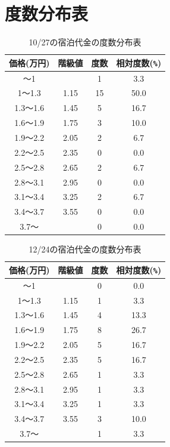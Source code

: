 \documentclass[11pt,a4j]{jsarticle}
\begin{document}
\section{度数分布表}

\begin{table}[H]
  \caption{10/27の宿泊代金の度数分布表}
  \label{tab:dosuu1}
  \small
  \begin{center}
      \begin{tabular}{c|c|c|c}
        \hline
        \toprule
        価格(万円) & 階級値 & 度数 & 相対度数(\verb|%|) \\
        \midrule
        〜1	&		&	1	&	3.3	\\
        1〜1.3	&	1.15	&	15	&	50.0	\\
        1.3〜1.6	&	1.45	&	5	&	16.7	\\
        1.6〜1.9	&	1.75	&	3	&	10.0	\\
        1.9〜2.2	&	2.05	&	2	&	6.7	\\
        2.2〜2.5	&	2.35	&	0	&	0.0	\\
        2.5〜2.8	&	2.65	&	2	&	6.7	\\
        2.8〜3.1	&	2.95	&	0	&	0.0	\\
        3.1〜3.4	&	3.25	&	2	&	6.7	\\
        3.4〜3.7	&	3.55	&	0	&	0.0	\\
        3.7〜	&		&	0	&	0.0	\\
        \hline
      \end{tabular}
  \end{center}
\end{table}

\begin{table}[H]
  \caption{12/24の宿泊代金の度数分布表}
  \label{tab:dosuu2}
  \small
  \begin{center}
      \begin{tabular}{c|c|c|c}
        \hline
        \toprule
        価格(万円) & 階級値 & 度数 & 相対度数(\verb|%|) \\
        \midrule
        〜1	&		&	0	&	0.0	\\
        1〜1.3	&	1.15	&	1	&	3.3	\\
        1.3〜1.6	&	1.45	&	4	&	13.3	\\
        1.6〜1.9	&	1.75	&	8	&	26.7	\\
        1.9〜2.2	&	2.05	&	5	&	16.7	\\
        2.2〜2.5	&	2.35	&	5	&	16.7	\\
        2.5〜2.8	&	2.65	&	1	&	3.3	\\
        2.8〜3.1	&	2.95	&	1	&	3.3	\\
        3.1〜3.4	&	3.25	&	1	&	3.3	\\
        3.4〜3.7	&	3.55	&	3	&	10.0	\\
        3.7〜	&		&	1	&	3.3	\\
        \hline
      \end{tabular}
  \end{center}
\end{table}
\end{document}
